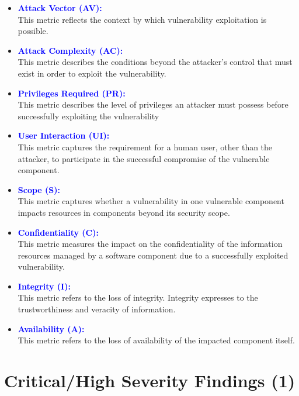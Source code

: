\documentclass{article}
\begin{document}
\begin{itemize}
	\item \textbf{\textcolor{blue}{Attack Vector (AV):}} \\ This metric reflects the context by which vulnerability exploitation is possible.
	\item \textbf{\textcolor{blue}{Attack Complexity (AC):}} \\ This metric describes the conditions beyond the attacker's control that must exist in order to exploit the vulnerability.
	\item \textbf{\textcolor{blue}{Privileges Required (PR):}} \\ This metric describes the level of privileges an attacker must possess before successfully exploiting the vulnerability
	\item \textbf{\textcolor{blue}{User Interaction (UI):}} \\ This metric captures the requirement for a human user, other than the attacker, to participate in the successful compromise of the vulnerable component.
	\item \textbf{\textcolor{blue}{Scope (S):}} \\ This metric captures whether a vulnerability in one vulnerable component impacts resources in components beyond its security scope.
	\item \textbf{\textcolor{blue}{Confidentiality (C):}} \\ This metric measures the impact on the confidentiality of the information resources managed by a software component due to a successfully exploited vulnerability.
	\item \textbf{\textcolor{blue}{Integrity (I):}} \\ This metric refers to the loss of integrity. Integrity expresses to the trustworthiness and veracity of information.
	\item \textbf{\textcolor{blue}{Availability (A):}} \\ This metric refers to the loss of availability of the impacted component itself.
\end{itemize}
\newpage
\section{Critical/High Severity Findings (1)}
\end{document}
